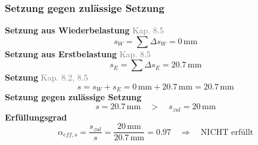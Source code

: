 \documentclass[11pt,a4paper]{article}
\newcommand{\normref}[1]{{\small\textcolor{gray}{#1}}}
\begin{document}
\subsubsection{Setzung gegen zulässige Setzung}
\noindent\textbf{Setzung aus Wiederbelastung} \hfill \normref{Kap. 8.5}
\begin{equation*}
s_W = \sum \Delta s_W = 0\,\mathrm{mm}
\end{equation*}
\noindent\textbf{Setzung aus Erstbelastung} \hfill \normref{Kap. 8.5}
\begin{equation*}
s_E = \sum \Delta s_E = 20.7\,\mathrm{mm}
\end{equation*}
\noindent\textbf{Setzung} \hfill \normref{Kap. 8.2, 8.5}
\begin{equation*}
s = s_W + s_E = 0\,\mathrm{mm} + 20.7\,\mathrm{mm} = 20.7\,\mathrm{mm}
\end{equation*}
\noindent\textbf{Setzung gegen zulässige Setzung}
\begin{equation*}
s = 20.7\,\mathrm{mm} \quad > \quad s_{zul} = 20\,\mathrm{mm}
\end{equation*}
\noindent\textbf{Erfüllungsgrad}
\begin{equation*}
\alpha_{eff,s} = \frac{s_{zul}}{s} = \frac{20\,\mathrm{mm}}{20.7\,\mathrm{mm}} = 0.97 \quad \Rightarrow \quad \text{NICHT erfüllt}
\end{equation*}
\end{document}

